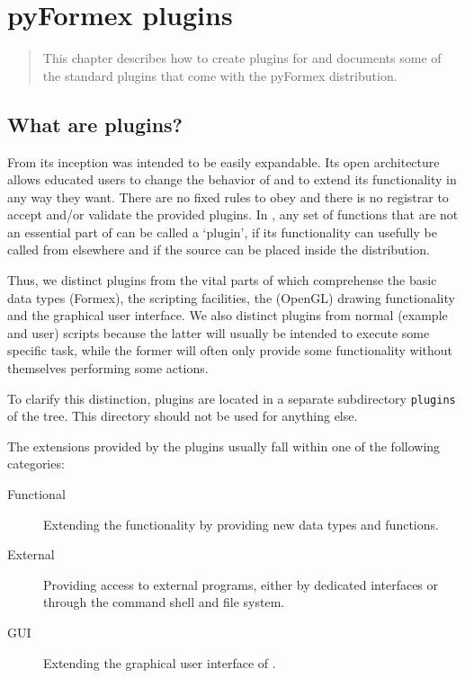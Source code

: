 

\chapter{pyFormex plugins}
\label{cha:plugins}

\ifhtml\begin{abstract}\fi
This chapter describes how to create plugins for \pyformex and documents some of the
standard plugins that come with the pyFormex distribution.
\ifhtml\end{abstract}\fi


\section{What are \pyformex plugins?}
\label{sec:plugins-def}

From its inception \pyformex was intended to be easily expandable. Its open 
architecture allows educated users to change the behavior of \pyformex and to extend its functionality in any way they want. There are no fixed rules to obey and there is no registrar to accept and/or validate the provided plugins. In \pyformex, any  set of functions that are not an essential part of \pyformex can be called a `plugin', if its functionality can usefully be called from elsewhere and if the source can be placed inside the \pyformex distribution.

Thus, we distinct plugins from the vital parts of \pyformex which comprehense the basic data types (Formex), the scripting facilities, the (OpenGL) drawing functionality and the graphical user interface.
We also distinct plugins from normal (example and user) \pyformex scripts because the latter will usually be intended to execute some specific task, while the former will often only provide some functionality without themselves performing some actions.

To clarify this distinction, plugins are located in a separate subdirectory \texttt{plugins} of the \pyformex tree. This directory should not be used for anything else. 

The extensions provided by the plugins usually fall within one of the following categories:
\begin{description}
\item[Functional] Extending the \pyformex functionality by providing new data types and functions.
\item[External] Providing access to external programs, either by dedicated interfaces or through the command shell and file system.
\item[GUI] Extending the graphical user interface of \pyformex. 
\end{description}
   
